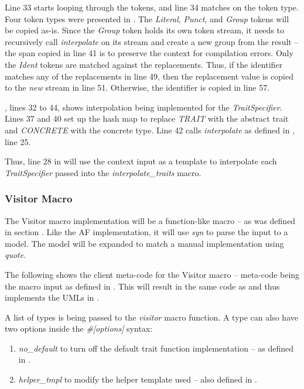 Line 33 starts looping through the tokens, and line 34 matches on the token type.
Four token types were presented in .
The \textit{Literal}, \textit{Punct}, and \textit{Group} tokens will be copied as-is.
Since the \textit{Group} token holds its own token stream, it needs to recursively call \textit{interpolate} on its stream and create a new group from the result -- the span copied in line 41 is to preserve the context for compilation errors.
Only the \textit{Ident} tokens are matched against the replacements.
Thus, if the identifier matches any of the replacements in line 49, then the replacement value is copied to the \textit{new} stream in line 51.
Otherwise, the identifier is copied in line 57.

, lines 32 to 44, shows interpolation being implemented for the \textit{TraitSpecifier}.
Lines 37 and 40 set up the hash map to replace \textit{TRAIT} with the abstract trait and \textit{CONCRETE} with the concrete type.
Line 42 calls \textit{interpolate} as defined in , line 25.

Thus, line 28 in  will use the context input as a template to interpolate each \textit{TraitSpecifier} passed into the \textit{interpolate\_traits} macro.

\subsubsection{Visitor Macro}
The Visitor macro implementation will be a function-like macro -- as was defined in section .
Like the AF implementation, it will use \textit{syn} to parse the input to a model.
The model will be expanded to match a manual implementation using \textit{quote}.

The following shows the client meta-code for the Visitor macro -- meta-code being the macro input as defined in .
This will result in the same code as  and thus implements the UMLs in .


A list of types is being passed to the \textit{visitor} macro function.
A type can also have two options inside the \textit{\#[options]} syntax:
\begin{enumerate}
	\item \textit{no\_default} to turn off the default trait function implementation -- as defined in .
	\item \textit{helper\_tmpl} to modify the helper template used -- also defined in .
\end{enumerate}

